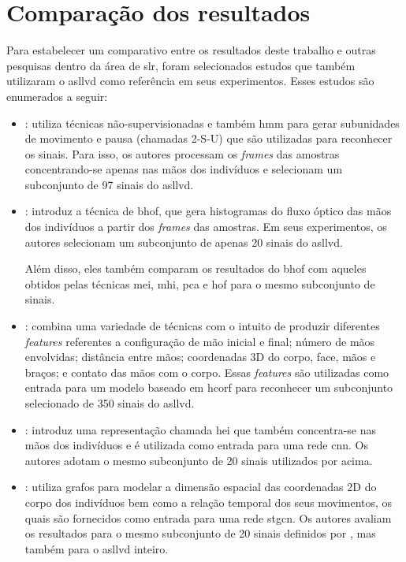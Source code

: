\section{Comparação dos resultados}
\label{sec:comparacao-resultados}

Para estabelecer um comparativo entre os resultados deste trabalho e outras pesquisas dentro da área de \acrfull{slr}, foram selecionados estudos que também utilizaram o \acrshort{asllvd} como referência em seus experimentos.
Esses estudos são enumerados a seguir:


\begin{itemize}
      \item \textbf{}: utiliza técnicas não-supervisionadas e também \acrfull{hmm} para gerar subunidades de movimento e pausa (chamadas 2-S-U) que são utilizadas para reconhecer os sinais.
            Para isso, os autores processam os \textit{frames} das amostras concentrando-se apenas nas mãos dos indivíduos e selecionam um subconjunto de 97 sinais do \acrshort{asllvd}.
 
      \item \textbf{}: introduz a técnica de \acrfull{bhof}, que gera histogramas do fluxo óptico das mãos dos indivíduos a partir dos \textit{frames} das amostras.
            Em seus experimentos, os autores selecionam um subconjunto de apenas 20 sinais do \acrshort{asllvd}.

            Além disso, eles também comparam os resultados do \acrshort{bhof} com aqueles obtidos pelas técnicas \acrfull{mei}, \acrfull{mhi}, \acrfull{pca} e \acrfull{hof} para o mesmo subconjunto de sinais.
 
      \item \textbf{}: combina uma variedade de técnicas com o intuito de produzir diferentes \textit{features} referentes a configuração de mão inicial e final; número de mãos envolvidas; distância entre mãos; coordenadas 3D do corpo, face, mãos e braços; e contato das mãos com o corpo.
            Essas \textit{features} são utilizadas como entrada para um modelo baseado em \acrfull{hcorf} para reconhecer um subconjunto selecionado de 350 sinais do \acrshort{asllvd}.
 
      \item \textbf{}: introduz uma representação chamada \acrfull{hei} que também concentra-se nas mãos dos indivíduos e é utilizada como entrada para uma rede \acrfull{cnn}.
            Os autores adotam o mesmo subconjunto de 20 sinais utilizados por  acima.
 
      \item \textbf{}: utiliza grafos para modelar a dimensão espacial das coordenadas 2D do corpo dos indivíduos bem como a relação temporal dos seus movimentos, os quais são fornecidos como entrada para uma rede \acrfull{stgcn}.
            Os autores avaliam os resultados para o mesmo subconjunto de 20 sinais definidos por , mas também para o \acrshort{asllvd} inteiro.
\end{itemize}


